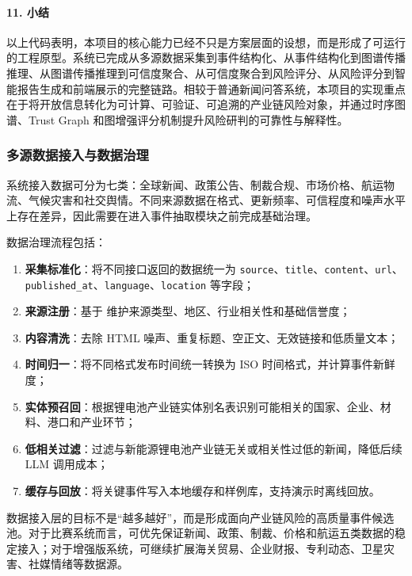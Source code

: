\documentclass[12pt,a4paper]{article}
\newcommand{\term}[1]{\textbf{#1}}
\begin{document}
\paragraph{11. 小结}

以上代码表明，本项目的核心能力已经不只是方案层面的设想，而是形成了可运行的工程原型。系统已完成从多源数据采集到事件结构化、从事件结构化到图谱传播推理、从图谱传播推理到可信度聚合、从可信度聚合到风险评分、从风险评分到智能报告生成和前端展示的完整链路。相较于普通新闻问答系统，本项目的实现重点在于将开放信息转化为可计算、可验证、可追溯的产业链风险对象，并通过时序图谱、Trust Graph 和图增强评分机制提升风险研判的可靠性与解释性。

\subsubsection{多源数据接入与数据治理}

系统接入数据可分为七类：全球新闻、政策公告、制裁合规、市场价格、航运物流、气候灾害和社交舆情。不同来源数据在格式、更新频率、可信程度和噪声水平上存在差异，因此需要在进入事件抽取模块之前完成基础治理。

数据治理流程包括：
\begin{enumerate}
    \item \term{采集标准化}：将不同接口返回的数据统一为 \texttt{source}、\texttt{title}、\texttt{content}、\texttt{url}、\texttt{published\_at}、\texttt{language}、\texttt{location} 等字段；
    \item \term{来源注册}：基于  维护来源类型、地区、行业相关性和基础信誉度；
    \item \term{内容清洗}：去除 HTML 噪声、重复标题、空正文、无效链接和低质量文本；
    \item \term{时间归一}：将不同格式发布时间统一转换为 ISO 时间格式，并计算事件新鲜度；
    \item \term{实体预召回}：根据锂电池产业链实体别名表识别可能相关的国家、企业、材料、港口和产业环节；
    \item \term{低相关过滤}：过滤与新能源锂电池产业链无关或相关性过低的新闻，降低后续 LLM 调用成本；
    \item \term{缓存与回放}：将关键事件写入本地缓存和样例库，支持演示时离线回放。
\end{enumerate}

数据接入层的目标不是“越多越好”，而是形成面向产业链风险的高质量事件候选池。对于比赛系统而言，可优先保证新闻、政策、制裁、价格和航运五类数据的稳定接入；对于增强版系统，可继续扩展海关贸易、企业财报、专利动态、卫星灾害、社媒情绪等数据源。
\end{document}
